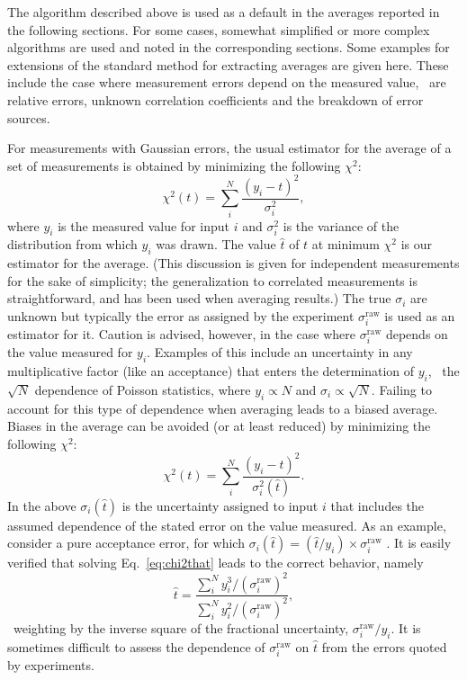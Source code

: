  The algorithm described above is used as a default in the averages
reported in the following sections.  For some cases, somewhat simplified
or more complex algorithms are used and noted in the corresponding 
sections. Some examples for extensions of the standard method for extracting
averages are given here. These include the case where measurement errors
depend on the measured value, \ie\ are relative errors, unknown
correlation coefficients and the breakdown of error sources.

For measurements with Gaussian errors, the usual estimator for the
average of a set of measurements is obtained by minimizing the following
$\chi^2$:
\begin{equation}
\chi^2(t) = \sum_i^N \frac{\left(y_i-t\right)^2}{\sigma^2_i} ,
\label{eq:chi2t}
\end{equation}
where $y_i$ is the measured value for input $i$ and $\sigma_i^2$ is the
variance of the distribution from which $y_i$ was drawn.  The value $\hat{t}$
of $t$ at minimum $\chi^2$ is our estimator for the average.  (This
discussion is given for independent measurements for the sake of
simplicity; the generalization to correlated measurements is
straightforward, and has been used when averaging results.) 
The true $\sigma_i$ are unknown but typically the error as assigned by the
experiment $\sigma_i^{\mathrm{raw}}$ is used as an estimator for it.
Caution is advised,
however, in the case where $\sigma_i^{\mathrm{raw}}$
depends on the value measured for $y_i$. Examples of this include
an uncertainty in any multiplicative factor (like
an acceptance) that enters the determination of $y_i$, \ie\ the $\sqrt{N}$
dependence of Poisson statistics, where $y_i \propto N$
and $\sigma_i \propto \sqrt{N}$.
Failing to account for this type of
dependence when averaging leads to a biased average.
Biases in the average can be avoided (or at least reduced)
by minimizing the following
$\chi^2$:
\begin{equation}
\chi^2(t) = \sum_i^N \frac{\left(y_i-t\right)^2}{\sigma^2_i(\hat{t})} .
\label{eq:chi2that}
\end{equation}
In the above $\sigma_i(\hat{t})$ is the uncertainty
assigned to input $i$ that includes the assumed dependence of the
stated error on the value measured.  As an example, consider 
a pure acceptance error, for which
$\sigma_i(\hat{t}) = (\hat{t} / y_i)\times\sigma_i^{\mathrm{raw}}$ .
It is easily verified that solving Eq.~\ref{eq:chi2that} 
leads to the correct behavior, namely
$$ 
\hat{t} = \frac{\sum_i^N y_i^3/(\sigma_i^{\mathrm{raw}})^2}{\sum_i^N y_i^2/(\sigma_i^{\mathrm{raw}})^2},
$$
\ie\ weighting by the inverse square of the 
fractional uncertainty, $\sigma_i^{\mathrm{raw}}/y_i$.
It is sometimes difficult to assess the dependence of $\sigma_i^{\mathrm{raw}}$ on
$\hat{t}$ from the errors quoted by experiments.  

